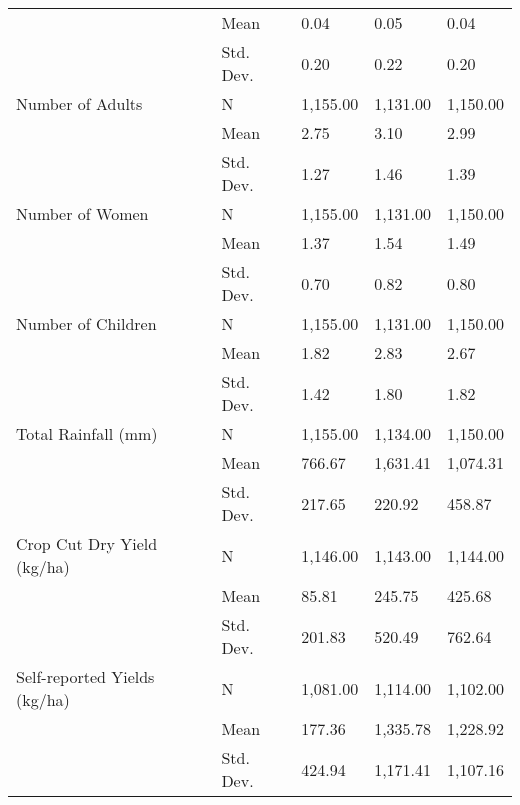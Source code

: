 \begin{longtable}{lllll}
                             & Mean &      0.04 &      0.05 &      0.04 \\
                             & Std. Dev. &      0.20 &      0.22 &      0.20 \\
Number of Adults & N &  1,155.00 &  1,131.00 &  1,150.00 \\
                             & Mean &      2.75 &      3.10 &      2.99 \\
                             & Std. Dev. &      1.27 &      1.46 &      1.39 \\
Number of Women & N &  1,155.00 &  1,131.00 &  1,150.00 \\
                             & Mean &      1.37 &      1.54 &      1.49 \\
                             & Std. Dev. &      0.70 &      0.82 &      0.80 \\
Number of Children & N &  1,155.00 &  1,131.00 &  1,150.00 \\
                             & Mean &      1.82 &      2.83 &      2.67 \\
                             & Std. Dev. &      1.42 &      1.80 &      1.82 \\
Total Rainfall (mm) & N &  1,155.00 &  1,134.00 &  1,150.00 \\
                             & Mean &    766.67 &  1,631.41 &  1,074.31 \\
                             & Std. Dev. &    217.65 &    220.92 &    458.87 \\
Crop Cut Dry Yield (kg/ha) & N &  1,146.00 &  1,143.00 &  1,144.00 \\
                             & Mean &     85.81 &    245.75 &    425.68 \\
                             & Std. Dev. &    201.83 &    520.49 &    762.64 \\
Self-reported Yields (kg/ha) & N &  1,081.00 &  1,114.00 &  1,102.00 \\
                             & Mean &    177.36 &  1,335.78 &  1,228.92 \\
                             & Std. Dev. &    424.94 &  1,171.41 &  1,107.16 \\
\end{longtable}
